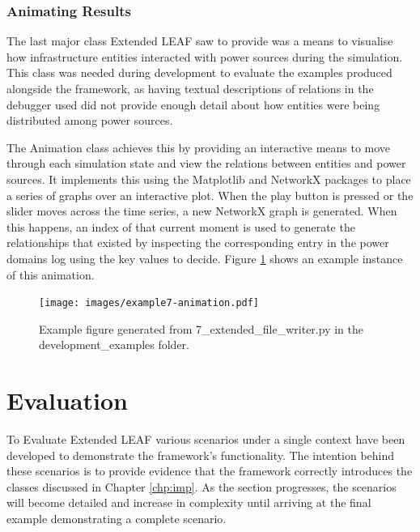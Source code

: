 \documentclass{l4proj}
\begin{document}
\subsection{Animating Results}\label{subsec:imp:animation}
The last major class Extended LEAF saw to provide was a means to visualise how infrastructure entities interacted with power sources during the simulation.
This class was needed during development to evaluate the examples produced alongside the framework, as having textual descriptions of relations in the debugger used did not provide enough detail about how entities were being distributed among power sources.

The Animation class achieves this by providing an interactive means to move through each simulation state and view the relations between entities and power sources.
It implements this using the Matplotlib and NetworkX packages to place a series of graphs over an interactive plot.
When the play button is pressed or the slider moves across the time series, a new NetworkX graph is generated.
When this happens, an index of that current moment is used to generate the relationships that existed by inspecting the corresponding entry in the power domains log using the key values to decide.
Figure \ref{fig:dev-example7-animation} shows an example instance of this animation.
\begin{figure}[h]
    \centering
    \texttt{[image: images/example7-animation.pdf]}
    ~
    \caption{Example figure generated from 7\_extended\_file\_writer.py in the development\_examples folder.}
    \label{fig:dev-example7-animation}
\end{figure}


\chapter{Evaluation} \label{chp:evaluation}

To Evaluate Extended LEAF various scenarios under a single context have been developed to demonstrate the framework's functionality.
The intention behind these scenarios is to provide evidence that the framework correctly introduces the classes discussed in Chapter \ref{chp:imp}.
As the section progresses, the scenarios will become detailed and increase in complexity until arriving at the final example demonstrating a complete scenario.
\end{document}
